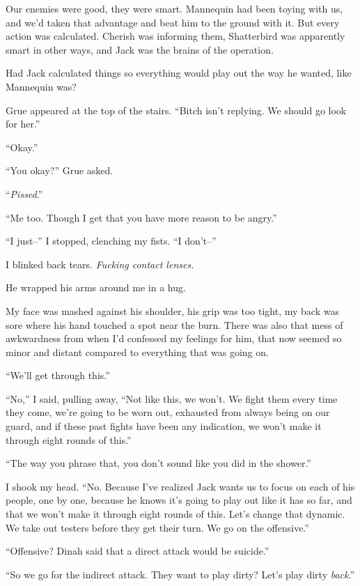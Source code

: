 Our enemies were good, they were smart.  Mannequin had been toying with us, and we'd taken that advantage and beat him to the ground with it.  But every action was calculated.  Cherish was informing them, Shatterbird was apparently smart in other ways, and Jack was the brains of the operation.



Had Jack calculated things so everything would play out the way he wanted, like Mannequin was?



Grue appeared at the top of the stairs.  ``Bitch isn't replying.  We should go look for her.''



``Okay.''



``You okay?'' Grue asked.



``\emph{Pissed}.''



``Me too.  Though I get that you have more reason to be angry.''



``I just--'' I stopped, clenching my fists.  ``I don't--''



I blinked back tears.  \emph{Fucking contact lenses.}



He wrapped his arms around me in a hug.



My face was mashed against his shoulder, his grip was too tight, my back was sore where his hand touched a spot near the burn.  There was also that mess of awkwardness from when I'd confessed my feelings for him, that now seemed so minor and distant compared to everything that was going on.



``We'll get through this.''



``No,'' I said, pulling away,  ``Not like this, we won't.  We fight them every time they come, we're going to be worn out, exhausted from always being on our guard, and if these past fights have been any indication, we won't make it through eight rounds of this.''



``The way you phrase that, you don't sound like you did in the shower.''



I shook my head.  ``No.  Because I've realized Jack wants us to focus on each of his people, one by one, because he knows it's going to play out like it has so far, and that we won't make it through eight rounds of this.  Let's change that dynamic.  We take out testers before they get their turn.  We go on the offensive.''



``Offensive?  Dinah said that a direct attack would be suicide.''



``So we go for the indirect attack.  They want to play dirty?  Let's play dirty \emph{back}.''





